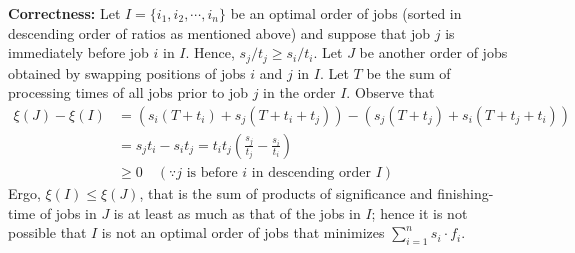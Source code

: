 \documentclass[tikz, letterpaper,12pt]{article}
\begin{document}
\textbf{Correctness:} Let $I=\{i_1,i_2,\cdots,i_n\}$ be an optimal order of jobs (sorted in descending order of ratios as mentioned above) and suppose that job $j$ is immediately before job $i$ in $I$. Hence, $s_j/t_j\geq s_i/t_i$. Let $J$ be another order of jobs obtained by swapping positions of jobs $i$ and $j$ in $I$. Let $T$ be the sum of processing times of all jobs prior to job $j$ in the order $I$. Observe that
\begin{align*}
    \xi(J)-\xi(I)&=(s_i(T+t_i)+s_j(T+t_i+t_j))-(s_j(T+t_j)+s_i(T+t_j+t_i))\\
    &=s_jt_i-s_it_j=t_it_j\left(\frac{s_j}{t_j}-\frac{s_i}{t_i}\right)\\
    &\geq 0\quad (\because j\text{ is before }i\text{ in descending order }I)
\end{align*}
Ergo, $\xi(I)\leq \xi(J)$, that is the sum of products of significance and finishing-time of jobs in $J$ is at least as much as that of the jobs in $I$; hence it is not possible that $I$ is not an optimal order of jobs that minimizes $\sum_{i=1}^n s_i\cdot f_i$.
\end{document}
